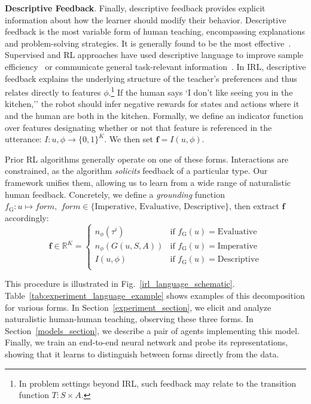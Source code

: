 \documentclass[letterpaper]{article} %
\begin{document}
\textbf{Descriptive Feedback}. Finally, descriptive feedback provides explicit information about how the learner should modify their behavior. Descriptive feedback is the most variable form of human teaching, encompassing explanations and problem-solving strategies. It is generally found to be the most effective~\citep{shute_2008, Lipnevich_education, van_der_klej_2015, Hattie_2007}. Supervised and RL approaches have used descriptive language to improve sample efficiency~\citep{srivastava2017_explanation, Hancock_2018_explanation, Ling2017_captions} or communicate general task-relevant information~\citep{narasimhan2018grounding}. In IRL, descriptive feedback explains the underlying structure of the teacher's preferences and thus relates directly to features $\phi$.\footnote{In problem settings beyond IRL, such feedback may relate to the transition function $T: S\times A$.} If the human says `I don't like seeing you in the kitchen,'' the robot should infer negative rewards for states and actions where it and the human are both in the kitchen. Formally, we define an indicator function over features designating whether or not that feature is referenced in the utterance: $I: u, \phi \rightarrow \{0,1\}^K$. We then set $\mathbf{f} = I(u, \phi)$.

Prior RL algorithms generally operate on one of these forms. Interactions are constrained, as the algorithm \emph{solicits} feedback of a particular type. Our framework unifies them, allowing us to learn from a wide range of naturalistic human feedback. Concretely, we define a \textit{grounding} function $f_\text{G}:u \mapsto \textit{form}, \textit{ form} \in\{\text{Imperative, Evaluative, Descriptive}\}$, then extract $\mathbf{f}$ accordingly:
\begin{equation}
    \textbf{f} \in \mathbb{R}^K =
\begin{cases}
    n_\phi(\tau^i) & \text{if } f_\text{G}(u) = \text{Evaluative} \\
   n_\phi(G(u, S, A)) & \text{if } f_\text{G}(u) = \text{Imperative} \\
    I(u, \phi) & \text{if } f_\text{G}(u) = \text{Descriptive} \\
\end{cases}
\label{forms_equation}
\end{equation}

This procedure is illustrated in Fig.~\ref{irl_language_schematic}. Table~\ref{tab:experiment_language_example} shows examples of this decomposition for various forms. In Section~\ref{experiment_section}, we elicit and analyze naturalistic human-human teaching, observing these three forms. In Section~\ref{models_section}, we describe a pair of agents implementing this model. Finally, we train an end-to-end neural network and probe its representations, showing that it learns to distinguish between forms directly from the data.
\end{document}
